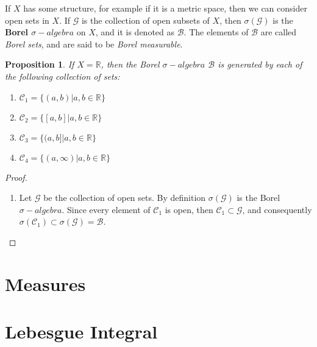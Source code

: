 \documentclass[aspectratio=169,handout]{beamer}
\newtheorem{proposition}{Proposition}[section]
\begin{document}
\begin{frame}
    \begin{definition}
        If $X$ has some structure, for example if it is a metric space, then we can consider open sets in $X$. If $\mathcal{G}$ is the collection of open subsets of $X$, then $\sigma(\mathcal{G})$ is the \textbf{Borel $\sigma-algebra$} on $X$, and it is denoted as $\mathcal{B}$. The elements of $\mathcal{B}$ are called \textit{Borel sets}, and are said to be \textit{Borel measurable}.    
    \end{definition}
\end{frame}

\begin{frame}
    \begin{proposition}
        If $X=\mathbb{R}$, then the Borel $\sigma-algebra$ $\mathcal{B}$ is generated by each of the following collection of sets:
        \begin{enumerate}
            \item $\mathcal{C}_1=\{(a,b)|a,b\in\mathbb{R}\}$
            \item $\mathcal{C}_2=\{[a,b]|a,b\in\mathbb{R}\}$
            \item $\mathcal{C}_3=\{(a,b]|a,b\in\mathbb{R}\}$
            \item $\mathcal{C}_4=\{(a,\infty)|a,b\in\mathbb{R}\}$
        \end{enumerate}
    \end{proposition}
\end{frame}

\begin{frame}
    \begin{proof}
        \begin{enumerate}
            \item Let $\mathcal{G}$ be the collection of open sets. By definition $\sigma(\mathcal{G})$ is the Borel $\sigma-algebra$. Since every element of $\mathcal{C}_1$ is open, then $\mathcal{C}_1\subset\mathcal{G}$, and consequently $\sigma(\mathcal{C}_1)\subset \sigma(\mathcal{G})=\mathcal{B}$.
        \end{enumerate}
        
    \end{proof}
    
\end{frame}

\section{Measures}

\section{Lebesgue Integral}
\end{document}
